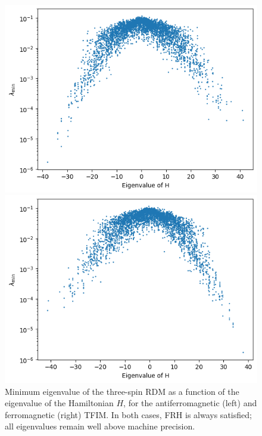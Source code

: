 \documentclass{article}
\begin{document}
\begin{figure}[h]
    \centering
    \begin{minipage}{0.45\textwidth}
        \centering
        \includegraphics[width=\linewidth]{3spins.png}
    \end{minipage}\hfill
    \begin{minipage}{0.45\textwidth}
        \centering
        \includegraphics[width=\linewidth]{3spins-ferro.png}
    \end{minipage}
    \caption{Minimum eigenvalue of the three-spin RDM as a function of the eigenvalue of the Hamiltonian $H$, for the antiferromagnetic (left) and ferromagnetic (right) TFIM. In both cases, FRH is always satisfied; all eigenvalues remain well above machine precision.}
    \label{fig:3spins}
\end{figure}
\end{document}
